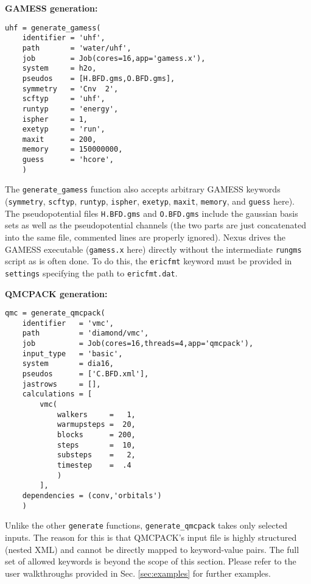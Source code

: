 \documentclass[oneside,11pt]{memoir}
\numberwithin{equation}{section}
\begin{document}
\vspace*{3mm}
\noindent
\textbf{GAMESS generation:}
\begin{verbatim}
uhf = generate_gamess(  
    identifier = 'uhf',
    path       = 'water/uhf',
    job        = Job(cores=16,app='gamess.x'),
    system     = h2o,
    pseudos    = [H.BFD.gms,O.BFD.gms],
    symmetry   = 'Cnv  2',
    scftyp     = 'uhf',
    runtyp     = 'energy',
    ispher     = 1,
    exetyp     = 'run',
    maxit      = 200,
    memory     = 150000000,
    guess      = 'hcore',
    )
\end{verbatim}

\noindent
The \texttt{generate\_gamess} function also accepts arbitrary GAMESS keywords (\texttt{symmetry}, \texttt{scftyp}, \texttt{runtyp}, \texttt{ispher}, \texttt{exetyp}, \texttt{maxit}, \texttt{memory}, and \texttt{guess} here).  The pseudopotential files \texttt{H.BFD.gms} and \texttt{O.BFD.gms} include the gaussian basis sets as well as the pseudopotential channels (the two parts are just concatenated into the same file, commented lines are properly ignored).  Nexus drives the GAMESS executable (\texttt{gamess.x} here) directly without the intermediate \texttt{rungms} script as is often done.  To do this, the \texttt{ericfmt} keyword must be provided in \texttt{settings} specifying the path to \texttt{ericfmt.dat}.    


\vspace*{3mm}
\noindent
\textbf{QMCPACK generation:}
\begin{verbatim}
qmc = generate_qmcpack(
    identifier   = 'vmc',
    path         = 'diamond/vmc',
    job          = Job(cores=16,threads=4,app='qmcpack'),
    input_type   = 'basic',
    system       = dia16,
    pseudos      = ['C.BFD.xml'],
    jastrows     = [],
    calculations = [
        vmc(
            walkers     =   1,
            warmupsteps =  20,
            blocks      = 200,
            steps       =  10,
            substeps    =   2,
            timestep    =  .4
            )
        ],
    dependencies = (conv,'orbitals')
    )
\end{verbatim}

\noindent
Unlike the other \texttt{generate} functions, \texttt{generate\_qmcpack} takes only selected inputs.  The reason for this is that QMCPACK's input file is highly structured (nested XML) and cannot be directly mapped to keyword-value pairs.  The full set of allowed keywords is beyond the scope of this section.  Please refer to the user walkthroughs provided in Sec. \ref{sec:examples} for further examples. 
\end{document}
